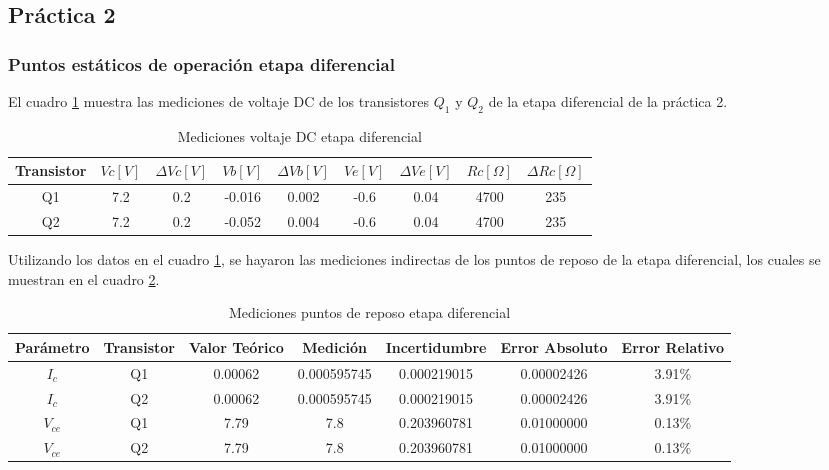 \subsection{Práctica 2}

\subsubsection{Puntos estáticos de operación etapa diferencial}

El cuadro \ref{tab:med-dc-etapa-diferencial} muestra las mediciones de voltaje DC de los transistores $Q_1$ y $Q_2$ de la etapa diferencial de la práctica 2.

\begin{table}[h!]
\centering
\begin{tabular}{|c|c|c|c|c|c|c|c|c|}
\hline
\textbf{Transistor} & \textbf{\(Vc[V]\)} & \textbf{\(\varDelta Vc[V]\)} & \textbf{\(Vb[V]\)} & \textbf{\(\varDelta Vb[V]\)} & \textbf{\(Ve[V]\)} & \textbf{\(\varDelta Ve[V]\)} & \textbf{\(Rc[\Omega]\)} & \textbf{\(\varDelta Rc[\Omega]\)} \\ \hline
Q1 & 7.2 & 0.2 & -0.016 & 0.002 & -0.6 & 0.04 & 4700 & 235 \\ \hline
Q2 & 7.2 & 0.2 & -0.052 & 0.004 & -0.6 & 0.04 & 4700 & 235 \\ \hline
\end{tabular}
\caption{Mediciones voltaje DC etapa diferencial}
\label{tab:med-dc-etapa-diferencial}
\end{table}

Utilizando los datos en el cuadro \ref{tab:med-dc-etapa-diferencial}, se hayaron las mediciones indirectas de los puntos de reposo de la etapa diferencial, los cuales se muestran en el cuadro \ref{tab:med-puntos-reposo-etapa-diferencial}.

\begin{table}[h!]
\centering
\begin{tabular}{|c|c|c|c|c|c|c|}
\hline
\textbf{Parámetro} & \textbf{Transistor} & \textbf{Valor Teórico} & \textbf{Medición} & \textbf{Incertidumbre} & \textbf{Error Absoluto} & \textbf{Error Relativo} \\ \hline
$I_{c}$ & Q1 & 0.00062 & 0.000595745 & 0.000219015 & 0.00002426 & 3.91\% \\ \hline
$I_{c}$ & Q2 & 0.00062 & 0.000595745 & 0.000219015 & 0.00002426 & 3.91\% \\ \hline
$V_{ce}$ & Q1 & 7.79 & 7.8 & 0.203960781 & 0.01000000 & 0.13\% \\ \hline
$V_{ce}$ & Q2 & 7.79 & 7.8 & 0.203960781 & 0.01000000 & 0.13\% \\ \hline
\end{tabular}
\caption{Mediciones puntos de reposo etapa diferencial}
\label{tab:med-puntos-reposo-etapa-diferencial}
\end{table}

